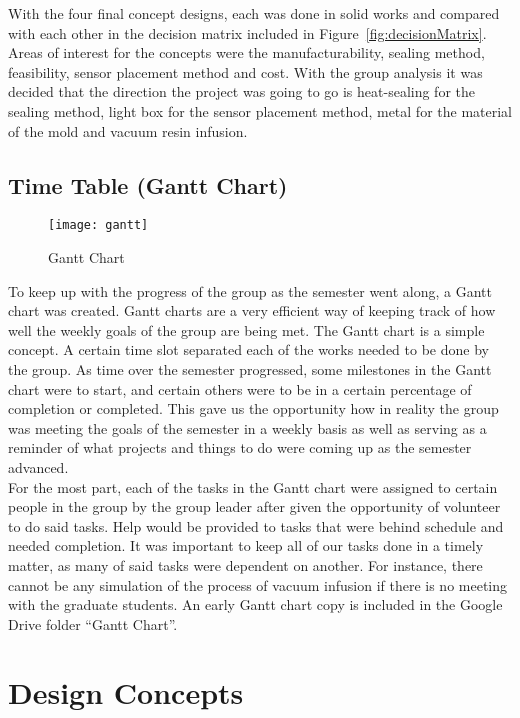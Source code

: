 \documentclass[12pt,letterpaper,notitlepage]{article}
\begin{document}
With the four final concept designs, each was done in solid works and compared with each other in the decision matrix included in Figure~\ref{fig:decisionMatrix}. Areas of interest for the concepts were the manufacturability, sealing method, feasibility, sensor placement method and cost. With the group analysis it was decided that the direction the project was going to go is heat-sealing for the sealing method, light box for the sensor placement method, metal for the material of the mold and vacuum resin infusion.
\subsection{Time Table (Gantt Chart)}
\begin{figure}[htbp]
\centering
\texttt{[image: gantt]}
\label{fig:gantt}
\caption{Gantt Chart}
\end{figure}
To keep up with the progress of the group as the semester went along, a Gantt chart was created. Gantt charts are a very efficient way of keeping track of how well the weekly goals of the group are being met.  The Gantt chart is a simple concept. A certain time slot separated each of the works needed to be done by the group. As time over the semester progressed, some milestones in the Gantt chart were to start, and certain others were to be in a certain percentage of completion or completed. This gave us the opportunity how in reality the group was meeting the goals of the semester in a weekly basis as well as serving as a reminder of what projects and things to do were coming up as the semester advanced.\\

For the most part, each of the tasks in the Gantt chart were assigned to certain people in the group by the group leader after given the opportunity of volunteer to do said tasks. Help would be provided to tasks that were behind schedule and needed completion. It was important to keep all of our tasks done in a timely matter, as many of said tasks were dependent on another. For instance, there cannot be any simulation of the process of vacuum infusion if there is no meeting with the graduate students.  An early Gantt chart copy is included in the Google Drive folder ``Gantt Chart''.\\

\section{Design Concepts}
\end{document}

